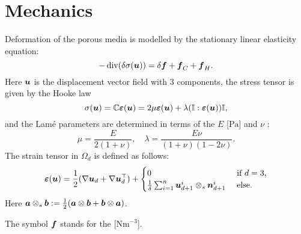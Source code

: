 \section{Mechanics}
\def\ee{\vc\varepsilon}
\newcommand{\eq}[1]{\begin{equation}#1\end{equation}}
\def\nn{\vc n}
\def\tr{\operatorname{tr}}
\def\uu{\vc u}

Deformation of the porous media is modelled by the stationary linear elasticity equation:
\eq{\label{eq:lin_el} -\div(\delta\tn \sigma(\uu)) = \delta\vc f + \vc f_C + \vc f_H. }
Here $\uu$  is the displacement vector field with 3 components, the stress tensor is given by the Hooke law
\eq{ \tn\sigma(\uu) = \tn C\ee(\uu) = 2\mu\ee(\uu) + \lambda(\tn I:\ee(\uu))\tn I, }
and the Lam\'e parameters are determined in terms of the  $E$ [$\mathrm{Pa}$] and  $\nu$ \units{}{}{}:
\eq{ \mu = \frac{E}{2(1+\nu)},\quad \lambda = \frac{E\nu}{(1+\nu)(1-2\nu)}. }
The strain tensor in $\Omega_d$ is defined as follows:
\eq{ \ee(\uu) = \frac12(\nabla\uu_d+\nabla\uu_d^\top) + \begin{cases}0&\mbox{ if }d=3,\\\frac1\delta\sum_{i=1}^n\uu_{d+1}^i\otimes_s\nn_{d+1}^i & \mbox{ else}.\end{cases} }
Here $\mathbf{\boldsymbol{a}}\otimes_s\mathbf{\boldsymbol{b}}:=\frac12(\mathbf{\boldsymbol{a}}\otimes\mathbf{\boldsymbol{b}}+\mathbf{\boldsymbol{b}}\otimes\mathbf{\boldsymbol{a}})$.

The symbol $\mathbf{\boldsymbol{f}}$ stands for the  [$\mathrm{Nm}^{-3}$].


